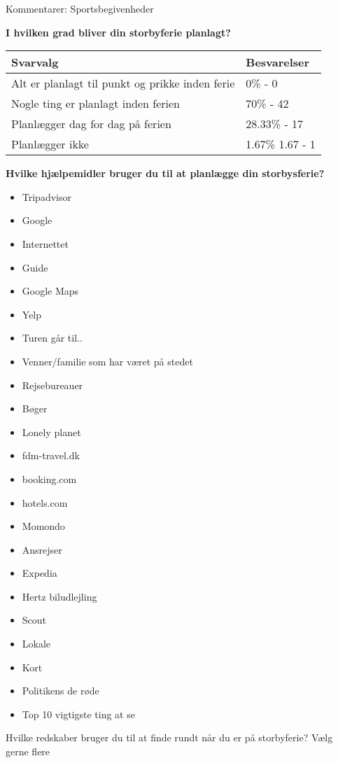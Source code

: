 Kommentarer:
Sportsbegivenheder

\textbf{I hvilken grad bliver din storbyferie planlagt?}

    \begin{tabular}{| l | l |}
    \hline
    Svarvalg & Besvarelser \\ \hline
    Alt er planlagt til punkt og prikke inden ferie & 0\% - 0 \\ \hline
    Nogle ting er planlagt inden ferien & 70\% - 42 \\ \hline
    Planlægger dag for dag på ferien & 28.33\% - 17 \\ \hline
    Planlægger ikke & 1.67\% 1.67 - 1 \\
    \hline
    \end{tabular}


\textbf{Hvilke hjælpemidler bruger du til at planlægge din storbysferie?}

\begin{itemize}
	\item Tripadvisor
	\item Google
	\item Internettet
	\item Guide
	\item Google Maps
	\item Yelp
	\item Turen går til..
	\item Venner/familie som har været på stedet
	\item Rejsebureauer
	\item Bøger
	\item Lonely planet
	\item fdm-travel.dk
	\item booking.com
	\item hotels.com
	\item Momondo
	\item Ansrejser
	\item Expedia
	\item Hertz biludlejling
	\item Scout
	\item Lokale
	\item Kort
	\item Politikens de røde
	\item Top 10 vigtigste ting at se
\end{itemize}

Hvilke redskaber bruger du til at finde rundt når du er på storbyferie?
Vælg gerne flere

